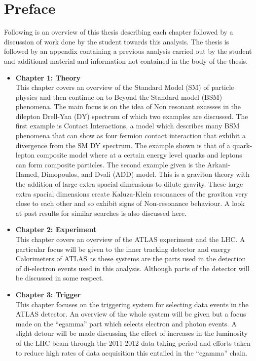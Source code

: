 \chapter*{Preface}

Following is an overview of this thesis describing each chapter followed by a discussion of work done by the student towards this analysis. The thesis is followed by an appendix containing a previous analysis carried out by the student and additional material and information not contained in the body of the thesis.

\begin{itemize}
\item{ 
{\bf Chapter 1: Theory} \\
This chapter covers an overview of the Standard Model (SM) of particle physics and then continue on to Beyond the Standard model (BSM) phenomena. The main focus is on the idea of Non resonant excesses in the dilepton Drell-Yan (DY) spectrum of which two examples are discussed. The first example is Contact Interactions, a model which describes many BSM phenomena that can show as four fermion contact interaction that exhibit a divergence from the SM DY spectrum. The example shown is that of a quark-lepton composite model where at a certain energy level quarks and leptons can form composite particles. The second example given is the Arkani-Hamed, Dimopoulos, and Dvali (ADD) model. This is a graviton theory with the addition of large extra spacial dimensions to dilute gravity. These large extra spacial dimensions create Kaluza-Klein resonances of the graviton very close to each other and so exhibit signs of Non-resonance behaviour. A look at past results for similar searches is also discussed here.
}
\item{ 
{\bf Chapter 2: Experiment} \\
This chapter covers an overview of the ATLAS experiment and the LHC. A particular focus will be given to the inner tracking detector and energy Calorimeters of ATLAS as these systems are the parts used in the detection of di-electron events used in this analysis. Although parts of the detector will be discussed in some respect.
}
\item{ 
{\bf Chapter 3: Trigger} \\
This chapter focuses on the triggering system for selecting data events in the ATLAS detector. An overview of the whole system will be given but a focus made on the ``egamma'' part which selects electron and photon events. A slight detour will be made discussing the effect of increases in the luminosity of the LHC beam through the 2011-2012 data taking period and efforts taken to reduce high rates of data acquisition this entailed in the ``egamma'' chain.
}
\end{itemize}
